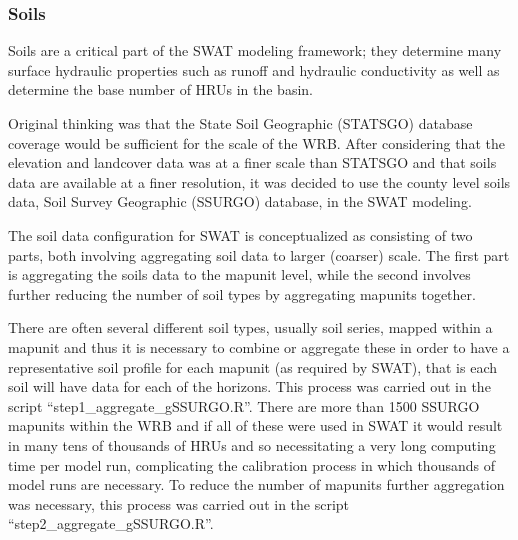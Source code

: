 \subsubsection{Soils}
Soils are a critical part of the SWAT modeling framework; they determine many surface hydraulic properties such as runoff and hydraulic conductivity as well as determine the base number of HRUs in the basin.   

Original thinking was that the State Soil Geographic (STATSGO) database coverage would be sufficient for the scale of the WRB. After considering that the elevation and landcover data was at a finer scale than STATSGO and that soils data are available at a finer resolution, it was decided to use the county level soils data, Soil Survey Geographic (SSURGO) database, in the SWAT modeling. %

The soil data configuration for SWAT is conceptualized as consisting of two parts, both involving aggregating soil data to larger (coarser) scale. The first part is aggregating the soils data to the mapunit level, while the second involves further reducing the number of soil types by aggregating mapunits together.		

There are often several different soil types, usually soil series, mapped within a mapunit and thus it is necessary to combine or aggregate these in order to have a representative soil profile for each mapunit (as required by SWAT), that is each soil will have data for each of the horizons. This process was carried out in the script ``step1\_aggregate\_gSSURGO.R''. There are more than 1500 SSURGO mapunits within the WRB and if all of these were used in SWAT it would result in many tens of thousands of HRUs and so necessitating a very long computing time per model run, complicating the calibration process in which thousands of model runs are necessary. To reduce the number of mapunits further aggregation was necessary, this process was carried out in the script ``step2\_aggregate\_gSSURGO.R''.
 

